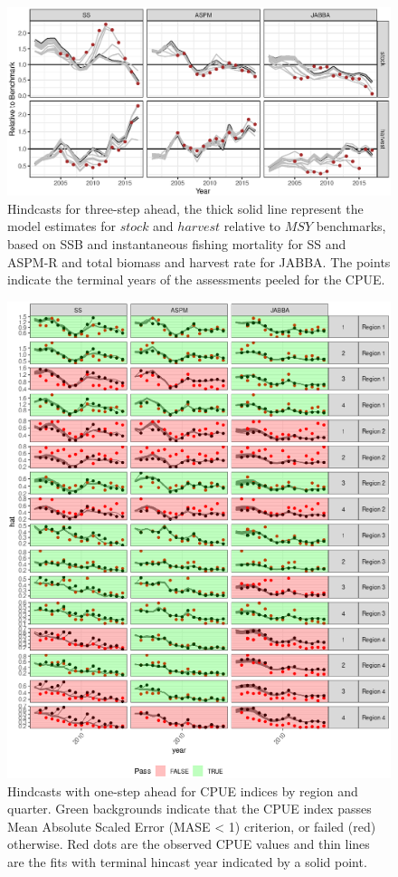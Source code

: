 \documentclass[11pt,a4paper]{article}
\begin{document}
{\begin{figure}
\centering
\includegraphics[width=6in]{fig3.eps}
\caption{Hindcasts for three-step ahead, the thick solid line represent the model estimates for $stock$ and $harvest$ relative to $MSY$ benchmarks, based on SSB and instantaneous fishing mortality for SS and ASPM-R and total biomass and harvest rate for JABBA. The points indicate the terminal years of the assessments peeled for the CPUE.}
\label{fig:retro3}
\end{figure}


\begin{figure}[htbp]
\centering
\includegraphics[width=6in]{fig4.eps}
\caption{Hindcasts with one-step ahead for CPUE indices by region and quarter. Green backgrounds indicate that the CPUE index passes Mean Absolute Scaled Error (MASE < 1) criterion, or failed (red) otherwise. Red dots are the observed CPUE values and thin lines are the fits with terminal hincast year indicated by a solid point.}
\label{fig:hy}
\end{figure}

}
\end{document}
